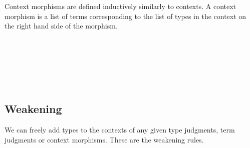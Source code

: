 \documentclass{acm_proc_article-sp}
\begin{document}
\begin{code}\>\<%
\\
\> \AgdaSymbol{:}   \AgdaSymbol{\}}      \AgdaSymbol{(} \AgdaSymbol{:}   \AgdaSymbol{)}     \<[47]%
\>[47]\<%
\\
\>\<\end{code}
Context morphisms are defined inductively similarly to contexts. A context morphism is a list of terms corresponding to the list of types in the context on the right hand side of the morphism.

\begin{code}\>\<%
\\
\>  \<%
\\
\>[0]\<[2]%
\>[2] \<[7]%
\>[7]\AgdaSymbol{:} \AgdaSymbol{\}}    \<%
\\
\>[0]\<[2]%
\>[2]\AgdaInductiveConstructor{\_,\_} \<[7]%
\>[7]\AgdaSymbol{:}  \AgdaSymbol{\}(} \AgdaSymbol{:}   \AgdaSymbol{)\{} \AgdaSymbol{:}  \AgdaSymbol{\}(} \AgdaSymbol{:}  \AgdaSymbol{(} \AgdaFunction{[}  \AgdaFunction{]T}\AgdaSymbol{))}\<%
\\
\>[2]\<[7]%
\>[7]   \AgdaSymbol{(} \AgdaInductiveConstructor{,} \AgdaSymbol{)}\<%
\\
\>\<\end{code}

\subsection{Weakening}

We can freely add types to the contexts of any given type judgments,
term judgments or context morphisms. These are the weakening rules.
\end{document}
